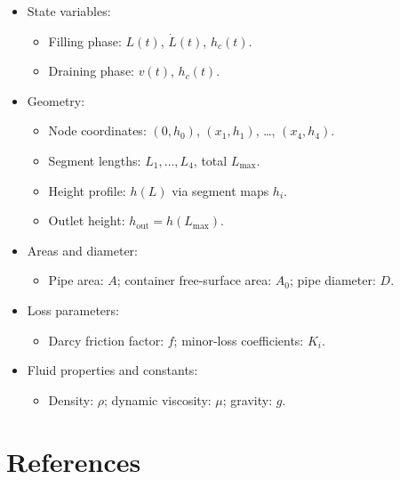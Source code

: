 \documentclass[11pt]{article}
\begin{document}
\begin{itemize}
  \item State variables:
    \begin{itemize}
      \item Filling phase: $L(t)$, $\dot L(t)$, $h_c(t)$.
      \item Draining phase: $v(t)$, $h_c(t)$.
    \end{itemize}
  \item Geometry:
    \begin{itemize}
      \item Node coordinates: $(0,h_0)$, $(x_1,h_1)$, \dots, $(x_4,h_4)$.
      \item Segment lengths: $L_1,\dots,L_4$, total $L_{\max}$.
      \item Height profile: $h(L)$ via segment maps $h_i$.
      \item Outlet height: $h_{\text{out}} = h(L_{\max})$.
    \end{itemize}
  \item Areas and diameter:
    \begin{itemize}
      \item Pipe area: $A$; container free-surface area: $A_0$; pipe diameter: $D$.
    \end{itemize}
  \item Loss parameters:
    \begin{itemize}
      \item Darcy friction factor: $f$; minor-loss coefficients: $K_i$.
    \end{itemize}
  \item Fluid properties and constants:
\begin{itemize}
      \item Density: $\rho$; dynamic viscosity: $\mu$; gravity: $g$.
    \end{itemize}
\end{itemize}

\section*{References}
\end{document}
